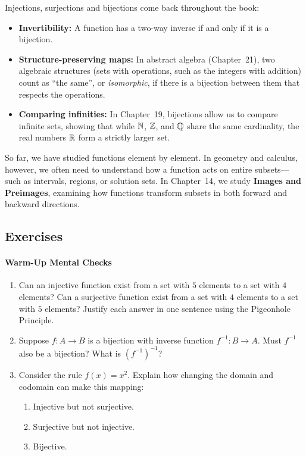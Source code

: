 Injections, surjections and bijections come back throughout the book:
\begin{itemize}
\item \textbf{Invertibility:} A function has a two-way inverse if and only if it is a bijection.
\item \textbf{Structure-preserving maps:} In abstract algebra (Chapter~21), two algebraic structures (sets with operations, such as the integers with addition) count as ``the same'', or \emph{isomorphic}, if there is a bijection between them that respects the operations.
\item \textbf{Comparing infinities:} In Chapter~19, bijections allow us to compare infinite sets, showing that while $\mathbb{N}$, $\mathbb{Z}$, and $\mathbb{Q}$ share the same cardinality, the real numbers $\mathbb{R}$ form a strictly larger set.
\end{itemize}

So far, we have studied functions element by element. In geometry and calculus, however, we often need to understand how a function acts on entire subsets---such as intervals, regions, or solution sets. In Chapter~14, we study \textbf{Images and Preimages}, examining how functions transform subsets in both forward and backward directions.

\subsection{Exercises}

\paragraph{Warm-Up Mental Checks}
\begin{enumerate}[label=\arabic*.]
\item Can an injective function exist from a set with $5$ elements to a set with $4$ elements? Can a surjective function exist from a set with $4$ elements to a set with $5$ elements? Justify each answer in one sentence using the Pigeonhole Principle.
\item Suppose $f: A \to B$ is a bijection with inverse function $f^{-1}: B \to A$. Must $f^{-1}$ also be a bijection? What is $(f^{-1})^{-1}$?
\item Consider the rule $f(x) = x^2$. Explain how changing the domain and codomain can make this mapping:
\begin{enumerate}[label=(\alph*)]
\item Injective but not surjective.
\item Surjective but not injective.
\item Bijective.
\end{enumerate}
\end{enumerate}

